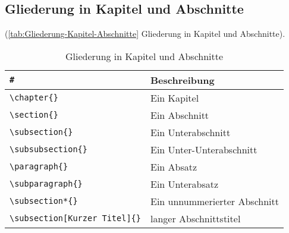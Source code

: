 \newpage

\subsection{Gliederung in Kapitel und Abschnitte}\label{sec:Gliederung-Kapitel-Abschnitte}

(\autoref{tab:Gliederung-Kapitel-Abschnitte} Gliederung in Kapitel und Abschnitte).
\begin{table}[!hb]%
	\centering
	\begin{tabular} {ll}
		\toprule %
		\verb|#| & \textbf{Beschreibung} \\
	  \midrule
		\verb|\chapter{}      | & Ein Kapitel\\
		\verb|\section{}      | & Ein Abschnitt\\
		\verb|\subsection{}   | & Ein Unterabschnitt\\
		\verb|\subsubsection{}| & Ein Unter-Unterabschnitt\\
		\verb|\paragraph{}    | & Ein Absatz\\
		\verb|\subparagraph{} | & Ein Unterabsatz\\
		\verb|\subsection*{}  | & Ein unnummerierter Abschnitt\\
		\verb|\subsection[Kurzer Titel]{}| & langer Abschnittstitel\\
		\bottomrule
	\end{tabular}
	\caption{Gliederung in Kapitel und Abschnitte}	%
	\label{tab:Gliederung-Kapitel-Abschnitte}	%
\end{table}

